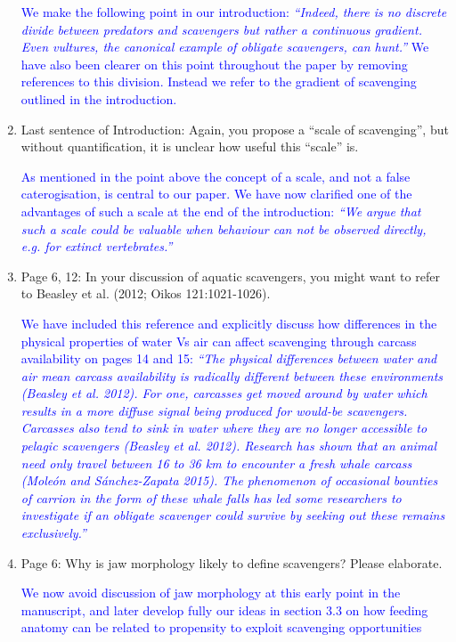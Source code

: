 \documentclass[12pt,letterpaper]{article}
\begin{document}
\begin{enumerate}
\textcolor{blue} {We make the following point in our introduction: \textit{``Indeed, there is no discrete divide between predators and scavengers but rather a continuous gradient. Even vultures, the canonical example of obligate scavengers, can hunt.''} We have also been clearer on this point throughout the paper by removing references to this division. Instead we refer to the gradient of scavenging outlined in the introduction.}

\item{Last sentence of Introduction: Again, you propose a ``scale of scavenging'', but without quantification, it is unclear how useful this ``scale'' is.}

\textcolor{blue}{As mentioned in the point above the concept of a scale, and not a false caterogisation, is central to our paper. We have now clarified one of the advantages of such a scale at the end of the introduction: \textit{``We argue that such a scale could be valuable when behaviour can not be observed directly, e.g. for extinct vertebrates.''}}

\item{Page 6, 12: In your discussion of aquatic scavengers, you might want to refer to Beasley et al. (2012; Oikos 121:1021-1026).}

\textcolor{blue}{We have included this reference and explicitly discuss how differences in the physical properties of water Vs air can affect scavenging \textcolor{blue}{through carcass availability on pages 14 and 15}: \textit{``The physical differences between water and air mean carcass availability is radically different between these environments (Beasley et al. 2012). For one, carcasses get moved around by water which results in a more diffuse signal being produced for would-be scavengers. Carcasses also tend to sink in water where they are no longer accessible to pelagic scavengers (Beasley et al. 2012). Research has shown that an animal need only travel between 16 to 36 km to encounter a fresh whale carcass  (Mole\'{o}n and Sánchez-Zapata 2015). The phenomenon of occasional bounties of carrion in the form of these whale falls has led some researchers to investigate if an obligate scavenger could survive by seeking out these remains exclusively.''}}

\item{Page 6: Why is jaw morphology likely to define scavengers?  Please elaborate.}

\textcolor{blue}{We now avoid discussion of jaw morphology at this early point in the manuscript, and later develop fully our ideas in section 3.3 on how feeding anatomy can be related to propensity to exploit scavenging opportunities}


\end{enumerate}
\end{document}
